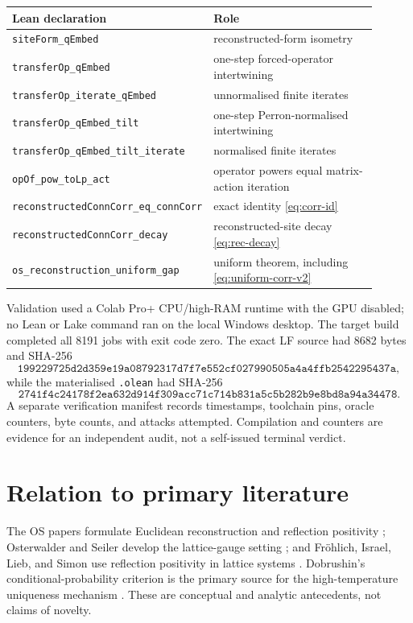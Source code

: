 \documentclass[11pt]{article}
\newcommand{\ModuleHash}{\texttt{199229725d2d359e19a08792317d7f7e552cf027990505a4a4ffb2542295437a}}
\newcommand{\OleanHash}{\texttt{2741f4c24178f2ea632d914f309acc71c714b831a5c5b282b9e8bd8a94a34478}}
\begin{document}
\begin{center}
\small
\begin{tabular}{@{}P{0.40\linewidth}P{0.50\linewidth}@{}}
\toprule
Lean declaration & Role \\
\midrule
\texttt{siteForm\_qEmbed} & reconstructed-form isometry \\
\texttt{transferOp\_qEmbed} & one-step forced-operator intertwining \\
\texttt{transferOp\_iterate\_qEmbed} & unnormalised finite iterates \\
\texttt{transferOp\_qEmbed\_tilt} & one-step Perron-normalised intertwining \\
\texttt{transferOp\_qEmbed\_tilt\_iterate} & normalised finite iterates \\
\texttt{opOf\_pow\_toLp\_act} & operator powers equal matrix-action iteration \\
\texttt{reconstructedConnCorr\_eq\_connCorr} & exact identity \eqref{eq:corr-id} \\
\texttt{reconstructedConnCorr\_decay} & reconstructed-site decay \eqref{eq:rec-decay} \\
\texttt{os\_reconstruction\_uniform\_gap} & uniform theorem, including \eqref{eq:uniform-corr-v2} \\
\bottomrule
\end{tabular}
\end{center}

Validation used a Colab Pro+ CPU/high-RAM runtime with the GPU disabled; no
Lean or Lake command ran on the local Windows desktop.  The target build
completed all 8191 jobs with exit code zero.  The exact LF source had 8682
bytes and SHA-256
\[
 \ModuleHash,
\]
while the materialised \texttt{.olean} had SHA-256
\[
 \OleanHash.
\]
A separate verification manifest records timestamps, toolchain pins, oracle
counters, byte counts, and attacks attempted.  Compilation and counters are
evidence for an independent audit, not a self-issued terminal verdict.

\section{Relation to primary literature}

The OS papers formulate Euclidean reconstruction and reflection positivity
\cite{OS1,OS2}; Osterwalder and Seiler develop the lattice-gauge setting
\cite{OsterwalderSeiler}; and Fr\"ohlich, Israel, Lieb, and Simon use reflection
positivity in lattice systems \cite{FILS}.  Dobrushin's conditional-probability
criterion is the primary source for the high-temperature uniqueness mechanism
\cite{Dobrushin1968}.  These are conceptual and analytic antecedents, not
claims of novelty.
\end{document}

